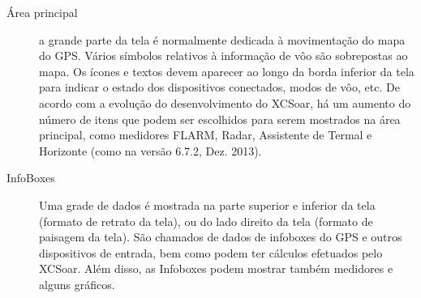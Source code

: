 \begin{description}
\item[Área principal] a grande parte da tela é normalmente dedicada à movimentação do mapa do GPS.  Vários símbolos relativos à informação de vôo são sobrepostas ao mapa.  Os ícones e textos devem aparecer ao longo da borda inferior da tela para indicar o estado dos dispositivos conectados, modos de vôo, etc.  De acordo com a evolução do desenvolvimento do XCSoar, há um aumento do número de itens que podem ser escolhidos para serem mostrados na área principal, como medidores FLARM, Radar, Assistente de Termal e Horizonte (como na versão 6.7.2, Dez. 2013).

\item[InfoBoxes] Uma grade de dados é mostrada na parte superior e inferior da tela (formato de retrato da tela), ou do lado direito da tela (formato de paisagem da tela).  São chamados de dados de infoboxes do GPS e outros dispositivos de entrada, bem como podem ter cálculos efetuados pelo XCSoar. Além disso, as Infoboxes podem mostrar também medidores e alguns gráficos.
\end{description}


